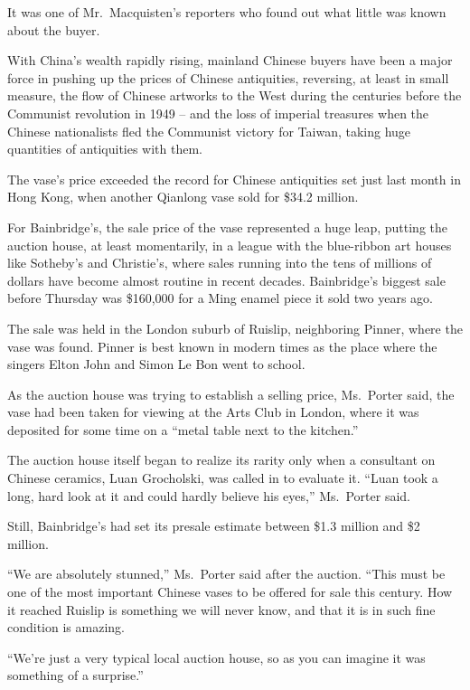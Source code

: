 ﻿\documentclass[12pt]{article}
\begin{document}
It was one of Mr.~Macquisten's reporters who found out what little was known about the buyer.

With China's wealth rapidly rising, mainland Chinese buyers have been a major force in pushing up
the prices of Chinese antiquities, reversing, at least in small measure, the flow of Chinese
artworks to the West during the centuries before the Communist revolution in 1949 -- and the loss of
imperial treasures when the Chinese nationalists fled the Communist victory for Taiwan, taking huge
quantities of antiquities with them.

The vase's price exceeded the record for Chinese antiquities set just last month in Hong Kong, when
another Qianlong vase sold for \$34.2 million.

For Bainbridge's, the sale price of the vase represented a huge leap, putting the auction house, at
least momentarily, in a league with the blue-ribbon art houses like Sotheby's and Christie's, where
sales running into the tens of millions of dollars have become almost routine in recent decades.
Bainbridge's biggest sale before Thursday was \$160,000 for a Ming enamel piece it sold two years
ago.

The sale was held in the London suburb of Ruislip, neighboring Pinner, where the vase was found.
Pinner is best known in modern times as the place where the singers Elton John and Simon Le Bon went
to school.

As the auction house was trying to establish a selling price, Ms.~Porter said, the vase had been
taken for viewing at the Arts Club in London, where it was deposited for some time on a ``metal
table next to the kitchen.''

The auction house itself began to realize its rarity only when a consultant on Chinese ceramics,
Luan Grocholski, was called in to evaluate it. ``Luan took a long, hard look at it and could hardly
believe his eyes,'' Ms.~Porter said.

Still, Bainbridge's had set its presale estimate between \$1.3 million and \$2 million.

``We are absolutely stunned,'' Ms.~Porter said after the auction. ``This must be one of the most
important Chinese vases to be offered for sale this century. How it reached Ruislip is something we
will never know, and that it is in such fine condition is amazing.

``We're just a very typical local auction house, so as you can imagine it was something of a
surprise.''
\end{document}
